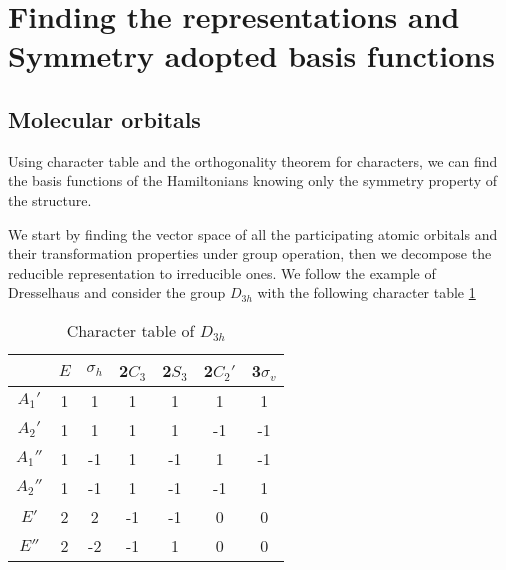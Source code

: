 \documentclass{article}
\begin{document}
\section{Finding the representations and Symmetry adopted basis functions}
\subsection{Molecular orbitals}
Using character table and the orthogonality theorem for characters, we can find the basis functions 
of the Hamiltonians knowing only the symmetry property of the structure. 

We start by finding the vector space of all the participating atomic orbitals and their transformation 
properties under group operation, then we decompose the reducible representation to irreducible ones. 
We follow the example of Dresselhaus\cite{dresselhaus_group_2008} and consider the group $D_{3h}$ with 
the following character table \ref{T:ct}
\begin{table}[h!]
    \centering
    \caption{Character table of $D_{3h}$}
    \begin{tabular}{|c|c|c|c|c|c|c|}
        \hline
                & $E$ & $\sigma_h$ & 2$C_3$ & 2$S_3$ & 2$C_2'$ & 3$\sigma_v$ \\ \hline
         $A_1'$ &  1  &  1         &  1     &  1     &   1     &   1         \\
         $A_2'$ &  1  &  1         &  1     &  1     &  -1     &  -1         \\
         $A_1''$&  1  & -1         &  1     & -1     &   1     &  -1         \\
         $A_2''$&  1  & -1         &  1     & -1     &  -1     &   1         \\
         $E'$   &  2  &  2         &  -1    & -1     &   0     &   0         \\
         $E''$  &  2  & -2         &  -1    &  1     &   0     &   0         \\ \hline
    \end{tabular}
    \label{T:ct}
\end{table}
\end{document}
